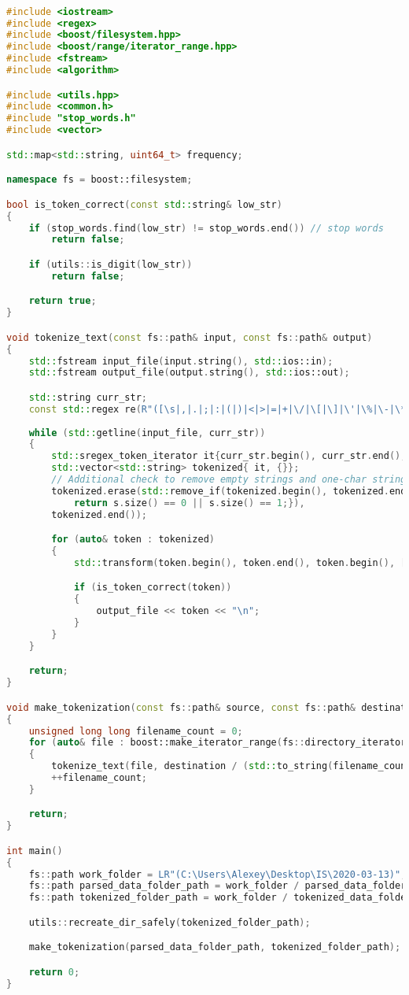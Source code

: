 \begin{lstlisting}[language=C++]

#include <iostream>
#include <regex>
#include <boost/filesystem.hpp>
#include <boost/range/iterator_range.hpp>
#include <fstream>
#include <algorithm>

#include <utils.hpp>
#include <common.h>
#include "stop_words.h"
#include <vector>

std::map<std::string, uint64_t> frequency;

namespace fs = boost::filesystem;

bool is_token_correct(const std::string& low_str)
{
	if (stop_words.find(low_str) != stop_words.end()) // stop words
		return false;

	if (utils::is_digit(low_str))
		return false;

	return true;
}

void tokenize_text(const fs::path& input, const fs::path& output)
{
	std::fstream input_file(input.string(), std::ios::in);
	std::fstream output_file(output.string(), std::ios::out);

	std::string curr_str;
	const std::regex re(R"([\s|,|.|;|:|(|)|<|>|=|+|\/|\[|\]|\'|\%|\-|\*|\?|\!|\@|\"]+)");
	
	while (std::getline(input_file, curr_str))
	{
		std::sregex_token_iterator it{curr_str.begin(), curr_str.end(), re, -1 };
		std::vector<std::string> tokenized{ it, {}};
		// Additional check to remove empty strings and one-char strings
		tokenized.erase(std::remove_if(tokenized.begin(), tokenized.end(),[](std::string const& s) {
			return s.size() == 0 || s.size() == 1;}),
		tokenized.end());

		for (auto& token : tokenized)
		{
			std::transform(token.begin(), token.end(), token.begin(), [](unsigned char c) { return std::tolower(c); });

			if (is_token_correct(token))
			{
				output_file << token << "\n";
			}
		}
	}

	return;
}

void make_tokenization(const fs::path& source, const fs::path& destination)
{
	unsigned long long filename_count = 0;
	for (auto& file : boost::make_iterator_range(fs::directory_iterator(source), {}))
	{
		tokenize_text(file, destination / (std::to_string(filename_count) + ".txt"));
		++filename_count;
	}

	return;
}

int main()
{
	fs::path work_folder = LR"(C:\Users\Alexey\Desktop\IS\2020-03-13)";
	fs::path parsed_data_folder_path = work_folder / parsed_data_folder;
	fs::path tokenized_folder_path = work_folder / tokenized_data_folder;

	utils::recreate_dir_safely(tokenized_folder_path);

	make_tokenization(parsed_data_folder_path, tokenized_folder_path);

	return 0;
}

\end{lstlisting}

\pagebreak

